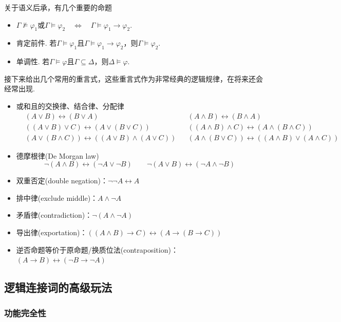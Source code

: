 \documentclass[main.tex]{subfiles}
\begin{document}
关于语义后承，有几个重要的命题
\begin{itemize}
    \item \(\Gamma \not \vDash \varphi_1 \mbox{或} \Gamma \vDash \varphi_2 \quad \Longleftrightarrow \quad \Gamma \vDash \varphi_1 \to \varphi_2\).
    \item 肯定前件. 若\(\Gamma \vDash \varphi_1\)且\(\Gamma \vDash \varphi_1 \to \varphi_2\)，则\(\Gamma \vDash \varphi_2\).
    \item 单调性. 若\(\Gamma \vDash \varphi\)且\(\Gamma \subseteq \Delta\)，则\(\Delta \vDash \varphi\).
\end{itemize}

接下来给出几个常用的重言式，这些重言式作为非常经典的逻辑规律，在将来还会经常出现.
\begin{itemize}
    \item 或和且的交换律、结合律、分配律
    \begin{align*}
        & (A \vee B) \leftrightarrow (B \vee A) && (A \wedge B) \leftrightarrow (B \wedge A) \\
        & ((A \vee B) \vee C) \leftrightarrow (A \vee (B \vee C)) && ((A \wedge B) \wedge C) \leftrightarrow (A \wedge (B \wedge C)) \\
        & (A \vee (B \wedge C)) \leftrightarrow ((A \vee B) \wedge (A \vee C)) && (A \wedge (B \vee C)) \leftrightarrow ((A \wedge B) \vee (A \wedge C))
    \end{align*}
    \item 德摩根律(De Morgan law)
    \[\neg(A \wedge B) \leftrightarrow (\neg A \vee \neg B) \qquad \neg (A \vee B) \leftrightarrow (\neg A \wedge \neg B)\]
    \item 双重否定(double negation)：\(\neg \neg A \leftrightarrow A\)
    \item 排中律(exclude middle)：\(A \wedge \neg A\)
    \item 矛盾律(contradiction)：\(\neg (A \wedge \neg A)\)
    \item 导出律(exportation)：\(((A \wedge B) \to C) \leftrightarrow (A \to (B \to C))\)
    \item 逆否命题等价于原命题/换质位法(contraposition)：\((A \to B) \leftrightarrow (\neg B \to \neg A)\)
\end{itemize}

\subsection{逻辑连接词的高级玩法}

\subsubsection*{功能完全性}
\end{document}

